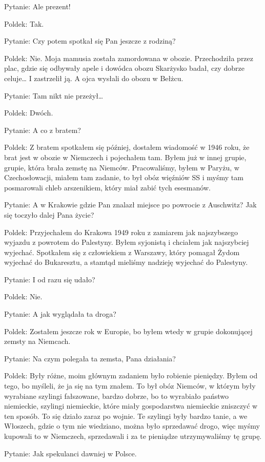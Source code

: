 Pytanie: Ale prezent! 

Poldek: Tak.   

Pytanie: Czy potem spotkał się Pan jeszcze z rodziną?  

Poldek: Nie. Moja mamusia została zamordowana w obozie. Przechodziła przez plac, gdzie się odbywały apele i dowódca obozu Skarżysko badał, czy dobrze celuje… I zastrzelił ją. A ojca wysłali do obozu w Bełżcu. 

Pytanie: Tam nikt nie przeżył… 

Poldek: Dwóch. 

Pytanie: A co z bratem? 

Poldek: Z bratem spotkałem się później, dostałem wiadomość w 1946 roku, że brat jest w obozie w Niemczech i pojechałem tam. Byłem już w innej grupie, grupie, która brała zemstę na Niemców. Pracowaliśmy, byłem w Paryżu, w Czechosłowacji, miałem tam zadanie, to był obóz więźniów SS i myśmy tam posmarowali chleb arszenikiem, który miał zabić tych esesmanów. 

Pytanie: A w Krakowie gdzie Pan znalazł miejsce po powrocie z Auschwitz? Jak się toczyło dalej Pana życie? 

Poldek: Przyjechałem do Krakowa 1949 roku z zamiarem jak najszybszego wyjazdu z powrotem do Palestyny. Byłem syjonistą i chciałem jak najszybciej wyjechać. Spotkałem się z człowiekiem z Warszawy, który pomagał Żydom wyjechać do Bukaresztu, a stamtąd mieliśmy nadzieję wyjechać do Palestyny.  

Pytanie: I od razu się udało? 

Poldek: Nie. 

Pytanie: A jak wyglądała ta droga?  

Poldek: Zostałem jeszcze rok w Europie, bo byłem wtedy w grupie dokonującej zemsty na Niemcach. 

Pytanie: Na czym polegała ta zemsta, Pana działania?   

Poldek: Były różne, moim głównym zadaniem było robienie pieniędzy. Byłem od tego, bo myśleli, że ja się na tym znałem. To był obóz Niemców, w którym były wyrabiane szylingi fałszowane, bardzo dobrze, bo to wyrabiało państwo niemieckie, szylingi niemieckie, które miały gospodarstwa niemieckie zniszczyć w ten sposób. To się działo zaraz po wojnie. Te szylingi były bardzo tanie, a we Włoszech, gdzie o tym nie wiedziano, można było sprzedawać drogo, więc myśmy kupowali to w Niemczech, sprzedawali i za te pieniądze utrzymywaliśmy tę grupę. 

Pytanie: Jak spekulanci dawniej w Polsce.  

